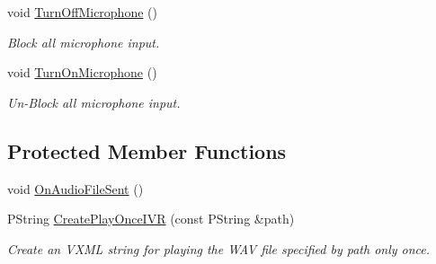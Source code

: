 \begin{CompactItemize}
void \hyperlink{classTelephonyIfc_4b81a2cfb03620cd829e8da73dfe0ea4}{TurnOffMicrophone} ()
\begin{CompactList}\small\item\em Block all microphone input. \item\end{CompactList}\item 
void \hyperlink{classTelephonyIfc_d5ecca9d510408b2ce43cb5b5071b357}{TurnOnMicrophone} ()
\begin{CompactList}\small\item\em Un-Block all microphone input. \item\end{CompactList}\end{CompactItemize}
\subsection*{Protected Member Functions}
\begin{CompactItemize}
\item 
void \hyperlink{classTelephonyIfc_95f4177c87b299ab8dd0a2a13a319e0e}{OnAudioFileSent} ()
\item 
PString \hyperlink{classTelephonyIfc_3a36df5d3544c1c2c930a9e912ac19ed}{CreatePlayOnceIVR} (const PString \&path)
\begin{CompactList}\small\item\em Create an VXML string for playing the WAV file specified by path only once. \item\end{CompactList}\end{CompactItemize}
